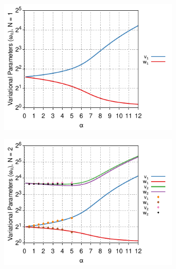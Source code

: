 \begin{figure}[!tbp]
    \centering
  \begin{subfigure}[b]{0.49\textwidth}
    \centering
    \includegraphics[width=\textwidth]{figures/frohlich-3d-multivariate-vw-alpha-0to12-beta-inf-N-1-COLOUR.pdf}
  \end{subfigure}
  \begin{subfigure}[b]{0.49\textwidth}
    \centering
    \includegraphics[width=\textwidth]{figures/frohlich-3d-multivariate-vw-alpha-0to12-beta-inf-N-2-COLOUR.pdf}
  \end{subfigure}
  \begin{subfigure}[b]{0.49\textwidth}
    \centering

\end{subfigure}
\end{figure}
